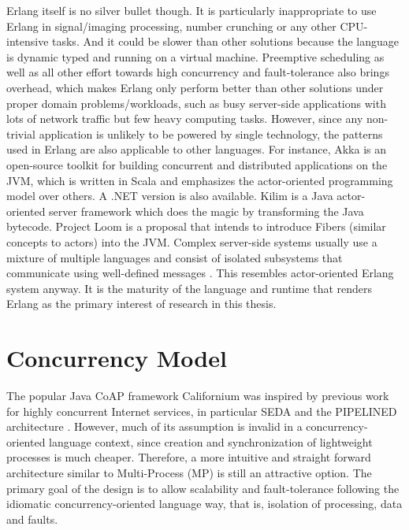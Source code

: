 Erlang itself is no silver bullet though. It is particularly inappropriate to use Erlang in signal/imaging processing, number crunching or any other CPU-intensive tasks. And it could be slower than other solutions because the language is dynamic typed and running on a virtual machine. Preemptive scheduling as well as all other effort towards high concurrency and fault-tolerance also brings overhead, which makes Erlang only perform better than other solutions under proper domain problems/workloads, such as busy server-side applications with lots of network traffic but few heavy computing tasks. However, since any non-trivial application is unlikely to be powered by single technology, the patterns used in Erlang are also applicable to other languages. For instance, Akka \autocite{akka} is an open-source toolkit for building concurrent and distributed applications on the JVM, which is written in Scala and emphasizes the actor-oriented programming model over others. A .NET version is also available. Kilim \autocite{srinivasan2008kilim}\autocite{UCAM-CL-TR-769} is a Java actor-oriented server framework which does the magic by transforming the Java bytecode. Project Loom \autocite{java-loom} is a proposal that intends to introduce Fibers (similar concepts to actors) into the JVM. Complex server-side systems usually use a mixture of multiple languages and consist of isolated subsystems that communicate using well-defined messages \autocite{UCAM-CL-TR-769}. This resembles actor-oriented Erlang system anyway. It is the maturity of the language and runtime that renders Erlang as the primary interest of research in this thesis.

\section{Concurrency Model}

The popular Java CoAP framework Californium was inspired by previous work for highly concurrent Internet services, in particular SEDA and the PIPELINED architecture \autocite{lanter2013scalability}. However, much of its assumption is invalid in a concurrency-oriented language context, since creation and synchronization of lightweight processes is much cheaper. Therefore, a more intuitive and straight forward architecture similar to Multi-Process (MP) is still an attractive option. The primary goal of the design is to allow scalability and fault-tolerance following the idiomatic concurrency-oriented language way, that is, isolation of processing, data and faults. 

